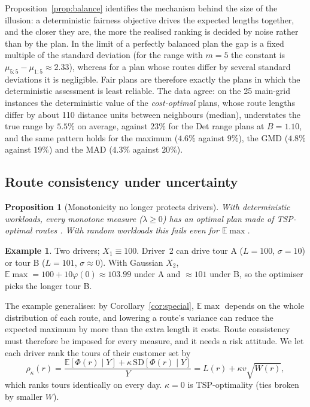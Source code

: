 \documentclass[11pt]{article}
\newtheorem{proposition}[theorem]{Proposition}
\theoremstyle{definition}
\newtheorem{example}[theorem]{Example}
\newcommand{\E}{\mathbb{E}}
\begin{document}
Proposition~\ref{prop:balance} identifies the mechanism behind the size of
the illusion: a deterministic fairness objective drives the expected lengths
together, and the closer they are, the more the realised ranking is decided by
noise rather than by the plan. In the limit of a perfectly balanced plan the
gap is a fixed multiple of the standard deviation (for the range with $m=5$
the constant is $\mu_{5:5}-\mu_{1:5}\approx2.33$), whereas for a plan whose
routes differ by several standard deviations it is negligible. Fair plans
are therefore exactly the plans in which the deterministic assessment is
least reliable. The data agree: on the 25 main-grid instances the
deterministic value of the \emph{cost-optimal} plans, whose route lengths
differ by about 110 distance units between neighbours (median), understates
the true range by $5.5\%$ on average, against $23\%$ for the Det range plans
at $B=1.10$, and the same pattern holds for the maximum ($4.6\%$ against $9\%$),
the GMD ($4.8\%$ against $19\%$) and the MAD ($4.3\%$ against $20\%$).

\subsection{Route consistency under uncertainty}\label{sec:th:consistency}

\begin{proposition}[Monotonicity no longer protects drivers]\label{prop:mono}
With deterministic workloads, every monotone measure ($\lambda\ge0$) has an
optimal plan made of TSP-optimal routes \citep{matl2018workload}. With random
workloads this fails even for $\E\max$.
\end{proposition}
\begin{example}
Two drivers; $X_1\equiv100$. Driver~2 can drive tour A ($L=100$, $\sigma=10$)
or tour B ($L=101$, $\sigma\approx0$). With Gaussian $X_2$,
$\E\max=100+10\varphi(0)\approx103.99$ under A and $\approx101$ under B, so the
optimiser picks the longer tour B.
\end{example}

The example generalises: by Corollary~\ref{cor:special}, $\E\max$ depends on
the whole distribution of each route, and lowering a route's variance can
reduce the expected maximum by more than the extra length it costs. Route
consistency must therefore be imposed for every measure, and it needs a risk
attitude. We let each driver rank the tours of their customer set by
\[
\rho_\kappa(r)=\frac{\E[\Phi(r)\mid Y]+\kappa\,\mathrm{SD}[\Phi(r)\mid Y]}{Y}=L(r)+\kappa v\sqrt{W(r)},
\]
which ranks tours identically on every day. $\kappa=0$ is TSP-optimality (ties
broken by smaller $W$).
\end{document}
